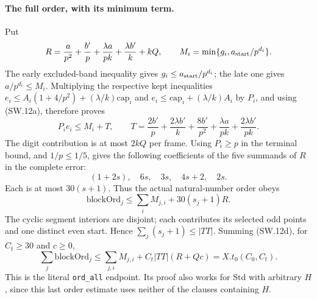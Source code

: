 \paragraph{The full order, with its minimum term.}
Put
\[
 R=\frac a{p^2}+\frac{b'}p+\frac{\lambda a}{pk}
     +\frac{\lambda b'}k+kQ,
 \qquad M_i=\min\{g_i,a_{\rm start}/p^{d_i}\}.
\]
The early excluded-band inequality gives
$g_i\le a_{\rm start}/p^{d_i}$; the late one gives
$a/p^{d_i}\le M_i$.
Multiplying the respective kept inequalities
$e_i\le A_i(1+4/p^2)+(\lambda/k)\mathrm{cap}_i$ and
$e_i\le\mathrm{cap}_i+(\lambda/k)A_i$ by $P_i$, and using
(SW.12a), therefore proves
\[
 P_i e_i\le M_i+T,\qquad
 T=\frac{2b'}p+\frac{2\lambda b'}k+\frac{8b'}{p^2}
       +\frac{\lambda a}{pk}+\frac{2\lambda b'}{pk}.
\]
The digit contribution is at most $2kQ$ per frame. Using $P_i\ge p$
in the terminal bound, and $1/p\le1/5$, gives the following coefficients
of the five summands of $R$ in the complete error:
\[
 (1+2s),\quad6s,\quad3s,\quad4s+2,\quad2s.
\]
Each is at most $30(s+1)$. Thus the actual natural-number order obeys
\[
 \mathrm{blockOrd}_j\le\sum_iM_{j,i}+30(s_j+1)R.
 \tag{SW.12d}
\]
The cyclic segment interiors are disjoint; each contributes its selected
odd points and one distinct even start. Hence
$\sum_j(s_j+1)\le|TT|$. Summing (SW.12d), for $C_t\ge30$ and $c\ge0$,
\[
 \sum_j\mathrm{blockOrd}_j
 \le\sum_{j,i}M_{j,i}+C_t|TT|(R+Qc)=X.t_0(C_0,C_t).
 \tag{SW.12e}
\]
This is the literal \texttt{ord\_all} endpoint. Its proof also works for
$\mathrm{Std}$ with arbitrary $H$, since this last order estimate uses
neither of the clauses containing $H$.
